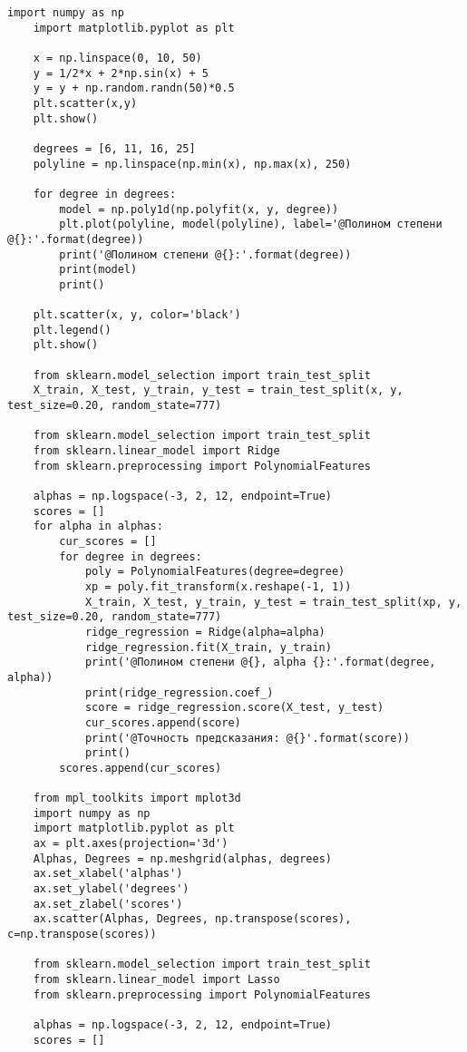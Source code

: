 \begin{lstlisting}[label=lst:1,caption=Обучение модели полиномиальной регрессии с регуляризацией]
	import numpy as np
	import matplotlib.pyplot as plt
	
	x = np.linspace(0, 10, 50)
	y = 1/2*x + 2*np.sin(x) + 5
	y = y + np.random.randn(50)*0.5
	plt.scatter(x,y)
	plt.show()
	
	degrees = [6, 11, 16, 25]
	polyline = np.linspace(np.min(x), np.max(x), 250)
	
	for degree in degrees:
		model = np.poly1d(np.polyfit(x, y, degree))
		plt.plot(polyline, model(polyline), label='@Полином степени @{}:'.format(degree))
		print('@Полином степени @{}:'.format(degree))
		print(model)
		print()
	
	plt.scatter(x, y, color='black')
	plt.legend()
	plt.show()
	
	from sklearn.model_selection import train_test_split
	X_train, X_test, y_train, y_test = train_test_split(x, y, test_size=0.20, random_state=777)
	
	from sklearn.model_selection import train_test_split
	from sklearn.linear_model import Ridge
	from sklearn.preprocessing import PolynomialFeatures
	
	alphas = np.logspace(-3, 2, 12, endpoint=True)
	scores = []
	for alpha in alphas:
		cur_scores = []
		for degree in degrees:
			poly = PolynomialFeatures(degree=degree)
			xp = poly.fit_transform(x.reshape(-1, 1))
			X_train, X_test, y_train, y_test = train_test_split(xp, y, test_size=0.20, random_state=777)
			ridge_regression = Ridge(alpha=alpha)
			ridge_regression.fit(X_train, y_train)
			print('@Полином степени @{}, alpha {}:'.format(degree, alpha))
			print(ridge_regression.coef_)
			score = ridge_regression.score(X_test, y_test)
			cur_scores.append(score)
			print('@Точность предсказания: @{}'.format(score))
			print()
		scores.append(cur_scores)
	
	from mpl_toolkits import mplot3d
	import numpy as np
	import matplotlib.pyplot as plt
	ax = plt.axes(projection='3d')
	Alphas, Degrees = np.meshgrid(alphas, degrees)
	ax.set_xlabel('alphas')
	ax.set_ylabel('degrees')
	ax.set_zlabel('scores')
	ax.scatter(Alphas, Degrees, np.transpose(scores), c=np.transpose(scores))
	
	from sklearn.model_selection import train_test_split
	from sklearn.linear_model import Lasso
	from sklearn.preprocessing import PolynomialFeatures
	
	alphas = np.logspace(-3, 2, 12, endpoint=True)
	scores = []
	

\end{lstlisting}
